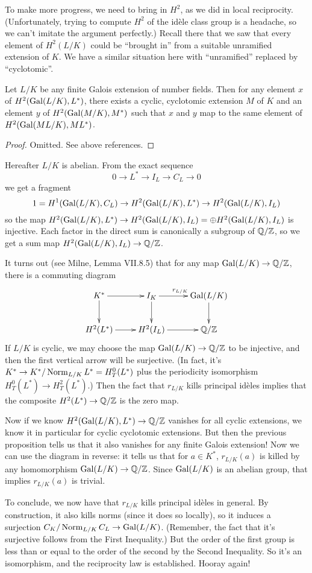 To make more progress, we need to bring in $H^2$, as we did in local
reciprocity. (Unfortunately, trying to compute $H^2$ of the id\`ele class
group is a headache, so we can't imitate the argument perfectly.)
Recall there that we saw that every element of $H^2(L/K)$
could be ``brought in'' from a suitable unramified extension of $K$.
We have a similar situation here with ``unramified'' replaced by
``cyclotomic''.
\begin{prop}
Let $L/K$ be any finite Galois extension of number fields. Then for any
element $x$ of $H^2(\operatorname{Gal}(L/K), L^*)$, there exists a cyclic, cyclotomic
extension $M$ of $K$ and an element $y$ of $H^2(\operatorname{Gal}(M/K), M^*)$ such that
$x$ and $y$ map to the same element of $H^2(\operatorname{Gal}(ML/K), ML^*)$.
\end{prop}
\begin{proof}
Omitted. See above references.
\end{proof}

Hereafter $L/K$ is abelian.
From the exact sequence
\[
0 \to L^* \to I_L \to C_L \to 0
\]
we get a fragment
\[
1 = H^1(\operatorname{Gal}(L/K), C_L)
\to H^2(\operatorname{Gal}(L/K), L^*) \to H^2(\operatorname{Gal}(L/K), I_L)
\]
so the map $H^2(\operatorname{Gal}(L/K), L^*) \to H^2(\operatorname{Gal}(L/K), I_L)
= \oplus H^2(\operatorname{Gal}(L/K), I_L)$ is injective. Each factor in the direct
sum is canonically a subgroup of $\mathbb{Q}/\mathbb{Z}$, so we get a sum map
$H^2(\operatorname{Gal}(L/K), I_L) \to \mathbb{Q}/\mathbb{Z}$.

It turns out (see Milne, Lemma VII.8.5)
that for any map $\operatorname{Gal}(L/K) \to \mathbb{Q}/\mathbb{Z}$,
there is a commuting diagram
\[
\xymatrix{
K^* \ar[r] \ar[d] & I_K \ar^{r_{L/K}}[r] \ar[d] &\Gal(L/K) \ar[d] \\
H^2(L^*) \ar[r] & H^2(I_L) \ar[r] & \QQ/\ZZ
}
\]
If $L/K$ is cyclic, we may choose the map $\operatorname{Gal}(L/K) \to \mathbb{Q}/\mathbb{Z}$
to be injective, and then the first vertical arrow will be surjective.
(In fact, it's $K^* \to K^*/\operatorname{Norm}_{L/K} L^* = H^0_T(L^*)$ plus the
periodicity isomorphism $H^0_T(L^*) \to H^2_T(L^*)$.)
Then the fact that $r_{L/K}$ kills principal id\`eles implies that
the composite $H^2(L^*) \to \mathbb{Q}/\mathbb{Z}$ is the zero map.

Now if we know $H^2(\operatorname{Gal}(L/K), L^*) \to \mathbb{Q}/\mathbb{Z}$ vanishes for all
cyclic extensions, we know it in particular for cyclic cyclotomic extensions.
But then the previous proposition tells us that it also vanishes for
any finite Galois extension!
Now we can use the diagram in reverse: it tells us that 
for $a \in K^*$, $r_{L/K}(a)$ is killed by any homomorphism
$\operatorname{Gal}(L/K) \to \mathbb{Q}/\mathbb{Z}$. Since $\operatorname{Gal}(L/K)$ is an abelian group, that 
implies $r_{L/K}(a)$ is trivial.

To conclude, we now have that $r_{L/K}$ kills principal id\`eles in general.
By construction, it also kills norms (since it does so locally),
so it induces a surjection $C_K/\operatorname{Norm}_{L/K} C_L \to \operatorname{Gal}(L/K)$.
(Remember, the fact that it's surjective follows from the First
Inequality.)
But the order of the first group is less than or equal to the order of the
second by the Second Inequality. So it's an isomorphism, and 
the reciprocity law is established. Hooray again!

%
